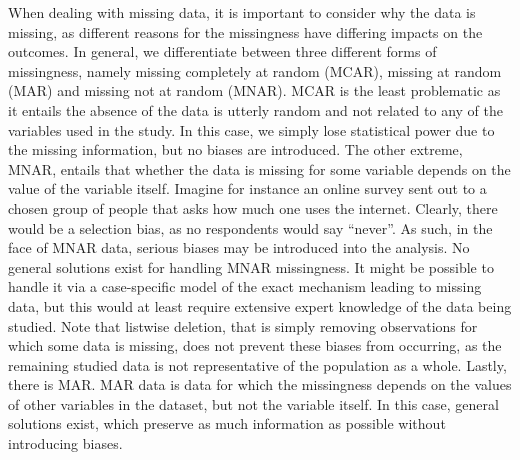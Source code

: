 When dealing with missing data, it is important to consider why the data is missing, as different reasons for the missingness
have differing impacts on the outcomes. In general, we differentiate between three different forms of missingness,
namely missing completely at random (MCAR), missing at random (MAR) and missing not at random (MNAR).
MCAR is the least problematic as it entails the absence of the data is utterly random and not related to any of the
variables used in the study. In this case, we simply lose statistical power due to the missing information, but
no biases are introduced.
The other extreme, MNAR, entails that whether the data is missing for some variable depends on the value of the variable itself.
Imagine for instance an online survey sent out to a chosen group of people that asks how much one uses the internet.
Clearly, there would be a selection bias, as no respondents would say ``never''.
As such, in the face of MNAR data, serious biases may be introduced into the analysis. No general solutions exist for handling
MNAR missingness. It might be possible to handle it via a case-specific model of the exact mechanism leading to missing data,
but this would at least require extensive expert knowledge of the data being studied. Note that listwise deletion,
that is simply removing observations for which some data is missing, does not prevent these biases from occurring,
as the remaining studied data is not representative of the population as a whole.
Lastly, there is MAR. MAR data is data for which the missingness depends on the values of other variables in the dataset,
but not the variable itself. In this case, general solutions exist, which preserve as much information as possible
without introducing biases.

